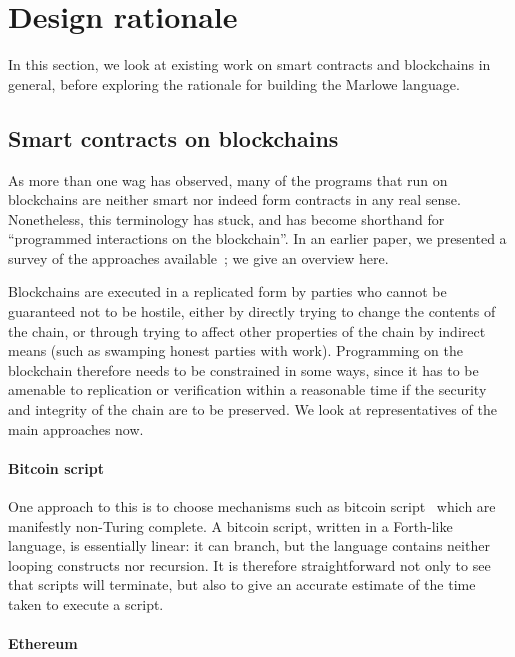 \documentclass[runningheads]{llncs}
\begin{document}
\section{Design rationale}
\label{section:design}

\medskip
\noindent
In this section, we look at existing work on smart contracts and blockchains in general, before exploring the rationale 
for building the Marlowe language.

\subsection{Smart contracts on blockchains}

As more than one wag has observed, many of the programs that run on blockchains are neither smart nor indeed form 
contracts in any real sense. Nonetheless, this terminology has stuck, and has become shorthand for ``programmed 
interactions on the blockchain''. In an earlier paper, we presented a survey of the approaches 
available~\cite{cryptoeprint:2016:1156}; we give an overview here.

Blockchains are executed in a replicated form by parties who cannot be guaranteed not to be hostile, either by directly 
trying to change the contents of the chain, or through trying to affect other properties of the chain by indirect means 
(such as swamping honest parties with work). Programming on the blockchain therefore needs to be constrained in some 
ways, since it has to be amenable to replication or verification within a reasonable time if the security and integrity 
of the chain are to be preserved. We look at representatives of the main approaches now.

\paragraph{Bitcoin script}

One approach to this is to choose mechanisms such as bitcoin script~\cite{BitcoinWikiScript} which are manifestly 
non-Turing complete. A bitcoin script, written in a Forth-like language, is essentially linear: it can branch, but the 
language contains neither looping constructs nor recursion. It is therefore straightforward not only to see that scripts 
will terminate, but also to give an accurate estimate of the time taken to execute a script. 

\paragraph{Ethereum}
\end{document}

